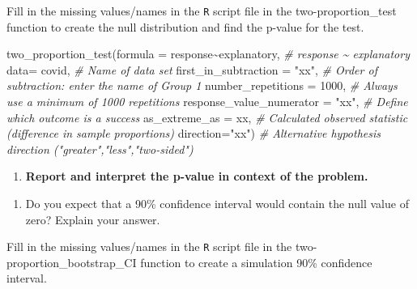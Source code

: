 \documentclass[
]{report}
\newenvironment{Shaded}{\begin{snugshade}}{\end{snugshade}}
\newcommand{\AttributeTok}[1]{\textcolor[rgb]{0.77,0.63,0.00}{#1}}
\newcommand{\CommentTok}[1]{\textcolor[rgb]{0.56,0.35,0.01}{\textit{#1}}}
\newcommand{\DecValTok}[1]{\textcolor[rgb]{0.00,0.00,0.81}{#1}}
\newcommand{\FunctionTok}[1]{\textcolor[rgb]{0.00,0.00,0.00}{#1}}
\newcommand{\NormalTok}[1]{#1}
\newcommand{\SpecialCharTok}[1]{\textcolor[rgb]{0.00,0.00,0.00}{#1}}
\newcommand{\StringTok}[1]{\textcolor[rgb]{0.31,0.60,0.02}{#1}}
\providecommand{\tightlist}{%
  \setlength{\itemsep}{0pt}\setlength{\parskip}{0pt}}
\begin{document}
\vspace{1in}

Fill in the missing values/names in the \texttt{R} script file in the two-proportion\_test function to create the null distribution and find the p-value for the test.

\begin{Shaded}
\begin{Highlighting}[]
\FunctionTok{two\_proportion\_test}\NormalTok{(}\AttributeTok{formula =}\NormalTok{ response}\SpecialCharTok{\textasciitilde{}}\NormalTok{explanatory, }\CommentTok{\# response \textasciitilde{} explanatory}
    \AttributeTok{data=}\NormalTok{ covid, }\CommentTok{\# Name of data set}
    \AttributeTok{first\_in\_subtraction =} \StringTok{"xx"}\NormalTok{, }\CommentTok{\# Order of subtraction: enter the name of Group 1}
    \AttributeTok{number\_repetitions =} \DecValTok{1000}\NormalTok{, }\CommentTok{\# Always use a minimum of 1000 repetitions}
    \AttributeTok{response\_value\_numerator =} \StringTok{"xx"}\NormalTok{, }\CommentTok{\# Define which outcome is a success }
    \AttributeTok{as\_extreme\_as =}\NormalTok{ xx, }\CommentTok{\# Calculated observed statistic (difference in sample proportions)}
    \AttributeTok{direction=}\StringTok{"xx"}\NormalTok{) }\CommentTok{\# Alternative hypothesis direction ("greater","less","two{-}sided")}
\end{Highlighting}
\end{Shaded}

\begin{enumerate}
\def\labelenumi{\arabic{enumi}.}
\setcounter{enumi}{9}
\tightlist
\item
  \textbf{Report and interpret the p-value in context of the problem.}
\end{enumerate}

\vspace{0.8in}

\begin{enumerate}
\def\labelenumi{\arabic{enumi}.}
\setcounter{enumi}{10}
\tightlist
\item
  Do you expect that a 90\% confidence interval would contain the null value of zero? Explain your answer.
\end{enumerate}

\vspace{0.8in}

Fill in the missing values/names in the \texttt{R} script file in the two-proportion\_bootstrap\_CI function to create a simulation 90\% confidence interval.
\end{document}
